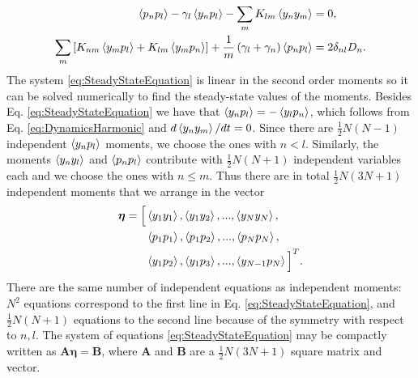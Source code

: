 %
%
\begin{equation}
    \begin{split}
        \expval{p_n p_l} - \gamma_l\expval{y_n p_l} - \sum_m K_{lm}\expval{y_n y_m} &= 0,\\
        \sum_{m}\left[ K_{nm}\expval{y_m p_l} + K_{lm}\expval{y_m p_n} \right] + \frac{1}{m}\left( \gamma_l + \gamma_n \right)\expval{p_n p_l} &= 2 \delta_{nl} D_n.
    \end{split}
    \label{eq:SteadyStateEquation}
\end{equation}
%
The system \eqref{eq:SteadyStateEquation} is linear in the second order moments so it can be solved numerically to find the steady-state values of the moments. Besides Eq. \eqref{eq:SteadyStateEquation} we have that $\expval{y_n p_l} = - \expval{y_l p_n}$, which follows from Eq. \eqref{eq:DynamicsHarmonic} and $d\expval{y_n y_m}/dt = 0$. Since there are $\frac{1}{2}N(N-1)$ independent $\expval{y_n p_l}$ moments, we choose the ones with $n<l$. Similarly, the moments $\expval{y_n y_l}$ and $\expval{p_n p_l}$ contribute with $\frac{1}{2}N(N+1)$ independent variables each and we choose the ones with $n\leq m$. Thus there are in total $\frac{1}{2}N(3N+1)$ independent moments that we arrange in the vector
%
\begin{equation}
\begin{split}
    \bm\eta = \Big[ &\expval{y_1 y_1},\expval{y_1 y_2},...,\expval{y_N y_N},\\
    &\expval{p_1 p_1},\expval{p_1 p_2},...,\expval{p_N p_N},\\
    &\expval{y_1 p_2},\expval{y_1 p_3},...,\expval{y_{N-1} p_N}\Big]^T.
    \label{eq:CovariancesVector}
\end{split}
\end{equation}
%
There are the same number of independent equations
as independent moments: $N^2$
equations correspond to the first line in Eq.  \eqref{eq:SteadyStateEquation}, and $\frac{1}{2}N(N+1)$ equations
to the second line because of the symmetry with respect to $n,l$. The system of equations \eqref{eq:SteadyStateEquation} may be compactly written as $\mathbf{A}\boldsymbol\eta = \mathbf{B}$, where $\mathbf{A}$ and $\mathbf{B}$ are a $\frac{1}{2}N(3N+1)$ square matrix and vector.
%
%
%
%
%
